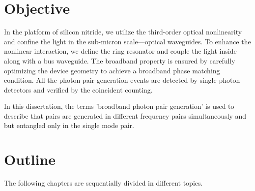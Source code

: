 \section{Objective}
In the platform of silicon nitride, we utilize the third-order optical nonlinearity and confine the light in the sub-micron scale---optical waveguides. To enhance the nonlinear interaction, we define the ring resonator and couple the light inside along with a bus waveguide. The broadband property is ensured by carefully optimizing the device geometry to achieve a broadband phase matching condition. All the photon pair generation events are detected by single photon detectors and verified by the coincident counting.

In this dissertation, the terms 'broadband photon pair generation' is used to describe that pairs are generated in different frequency pairs simultaneously and but entangled only in the single mode pair. 

\section{Outline}
The following chapters are sequentially divided in different topics.

